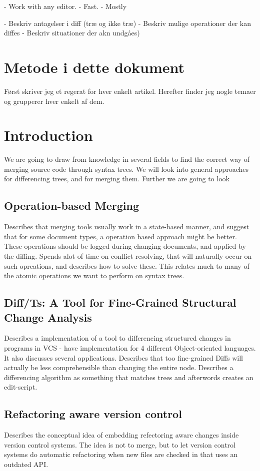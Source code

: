 \documentclass[12pt]{article}
\begin{document}
- Work with any editor.
- Fast.
- Mostly 

- Beskriv antagelser i diff (træ og ikke træ)
- Beskriv mulige operationer der kan diffes
- Beskriv situationer der akn undgåes)


\section{Metode i dette dokument}
Først skriver jeg et regerat for hver enkelt artikel. Herefter finder jeg nogle temaer og grupperer hver enkelt af dem.

\section{Introduction}
We are going to draw from knowledge in several fields to find the correct way of merging source code through syntax trees. We will look into general approaches for differencing trees, and for merging them. Further we are going to look 	

\subsection{Operation-based Merging}
Describes that merging tools usually work in a state-based manner, and suggest that for some document types, a operation based approach might be better. These operations should be logged during changing documents, and applied by the diffing. Spends alot of time on conflict resolving, that will naturally occur on such opreations, and describes how to solve these. This relates much to many of the atomic operations we want to perform on syntax trees.

\subsection{Diff/Ts: A Tool for Fine-Grained Structural Change Analysis}
Describes a implementation of a tool to differencing structured changes in programs in VCS - have implementation for 4 different Object-oriented languages. It also discusses several applications. Describes that too fine-grained Diffs will actually be less comprehensible than changing the entire node. Describes a differencing algorithm as something that matches trees and afterwords creates an edit-script.

\subsection{Refactoring aware version control}
Describes the conceptual idea of embedding refectoring aware changes inside version control systems. The idea is not to merge, but to let version control systems do automatic refactoring when new files are checked in that uses an outdated API. 
\end{document}

